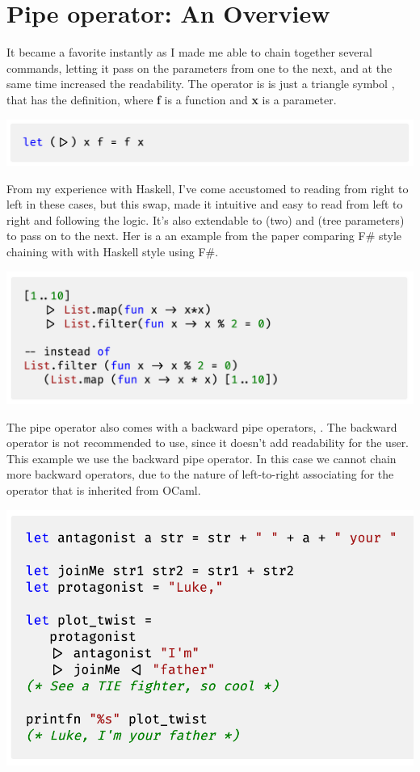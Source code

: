 \documentclass[12pt]{article}
\begin{document}
\newpage

\section{Pipe operator: An Overview}

It became a favorite instantly as I made me able to chain together several commands, letting it pass on the parameters from one to the next, and at the same time increased the readability. 
The operator is is just a triangle symbol \codeblock{|>}, that has the definition, where \textbf{f} is a function and \textbf{x} is a parameter.

\includegraphics[scale=0.6]{img/pipeline_def.png}

From my experience with Haskell, I've come accustomed to reading from right to left in these cases, but this swap, made it intuitive and easy to read from left to right and following the logic. It's also extendable to \codeblock{||>} (two) and \codeblock{|||>} (tree parameters) to pass on to the next.
Her is a an example from the paper comparing F\# style chaining with \codeblock{|>} with Haskell style using F\#.

\includegraphics[scale=0.55]{img/pipeline_example.png}

The pipe operator also comes with a backward pipe operators, .
The backward operator is not recommended to use, since it doesn't add readability for the user. This example we use the backward pipe operator. In this case we cannot chain more backward operators, due to the nature of left-to-right associating for the operator that is inherited from OCaml.

\includegraphics[scale=0.6]{img/episode5.png}
\end{document}
